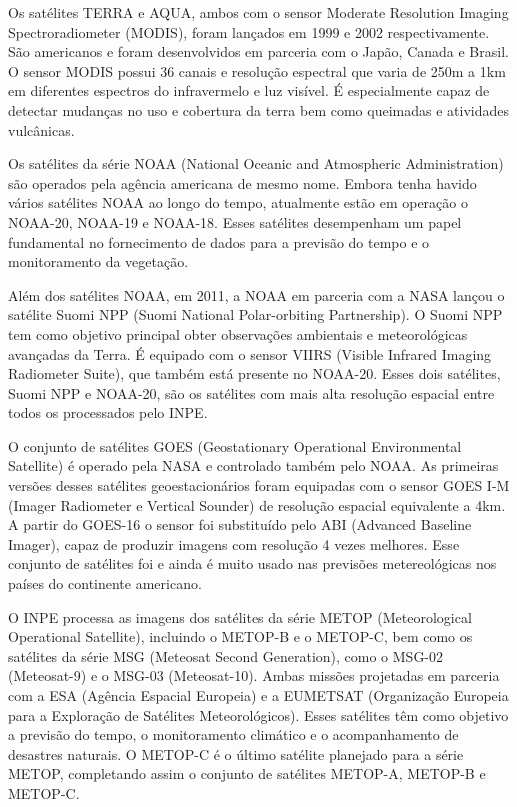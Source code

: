 \documentclass[cic,tc]{iiufrgs}
\begin{document}
Os satélites TERRA e AQUA, ambos com o sensor Moderate Resolution Imaging Spectroradiometer (MODIS), foram lançados em 1999 e 2002 respectivamente. São americanos e foram desenvolvidos em parceria com o Japão, Canada e Brasil. O sensor MODIS possui 36 canais e resolução espectral que varia de 250m a 1km em diferentes espectros do infravermelo e luz visível. É especialmente capaz de detectar mudanças no uso e cobertura da terra bem como queimadas e atividades vulcânicas. \par

Os satélites da série NOAA (National Oceanic and Atmospheric Administration) são operados pela agência americana de mesmo nome. Embora tenha havido vários satélites NOAA ao longo do tempo, atualmente estão em operação o NOAA-20, NOAA-19 e NOAA-18. Esses satélites desempenham um papel fundamental no fornecimento de dados para a previsão do tempo e o monitoramento da vegetação. 

Além dos satélites NOAA, em 2011, a NOAA em parceria com a NASA lançou o satélite Suomi NPP (Suomi National Polar-orbiting Partnership). O Suomi NPP tem como objetivo principal obter observações ambientais e meteorológicas avançadas da Terra. É equipado com o sensor VIIRS (Visible Infrared Imaging Radiometer Suite), que também está presente no NOAA-20. Esses dois satélites, Suomi NPP e NOAA-20, são os satélites com mais alta resolução espacial entre todos os processados pelo INPE. \par 

O conjunto de satélites GOES (Geostationary Operational Environmental Satellite) é operado pela NASA e controlado também pelo NOAA. As primeiras versões desses satélites geoestacionários foram equipadas com o sensor GOES I-M (Imager Radiometer e Vertical Sounder) de resolução espacial equivalente a 4km. A partir do GOES-16 o sensor foi substituído pelo ABI (Advanced Baseline Imager), capaz de produzir imagens com resolução 4 vezes melhores. Esse conjunto de satélites foi e ainda é muito usado nas previsões metereológicas nos países do continente americano. \par

O INPE processa as imagens dos satélites da série METOP (Meteorological Operational Satellite), incluindo o METOP-B e o METOP-C, bem como os satélites da série MSG (Meteosat Second Generation), como o MSG-02 (Meteosat-9) e o MSG-03 (Meteosat-10). Ambas missões projetadas em parceria com a ESA (Agência Espacial Europeia) e a EUMETSAT (Organização Europeia para a Exploração de Satélites Meteorológicos). Esses satélites têm como objetivo a previsão do tempo, o monitoramento climático e o acompanhamento de desastres naturais. O METOP-C é o último satélite planejado para a série METOP, completando assim o conjunto de satélites METOP-A, METOP-B e METOP-C.
\end{document}
